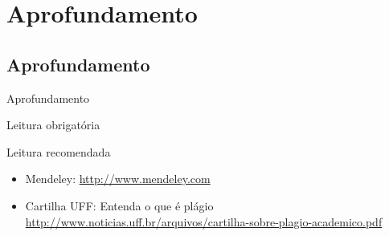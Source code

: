 \documentclass{beamer}
\begin{document}
\section{Aprofundamento}

\subsection{Aprofundamento}

\begin{frame}{Aprofundamento}
  \begin{block}{Leitura obrigatória}
  \end{block}
  \begin{block}{Leitura recomendada}
    \begin{itemize}
      \scriptsize
    \item Mendeley: {\tiny \url{http://www.mendeley.com}}
    \item Cartilha UFF: Entenda o que é plágio {\tiny \url{http://www.noticias.uff.br/arquivos/cartilha-sobre-plagio-academico.pdf}}
    \end{itemize}
  \end{block}
\end{frame}
\end{document}
